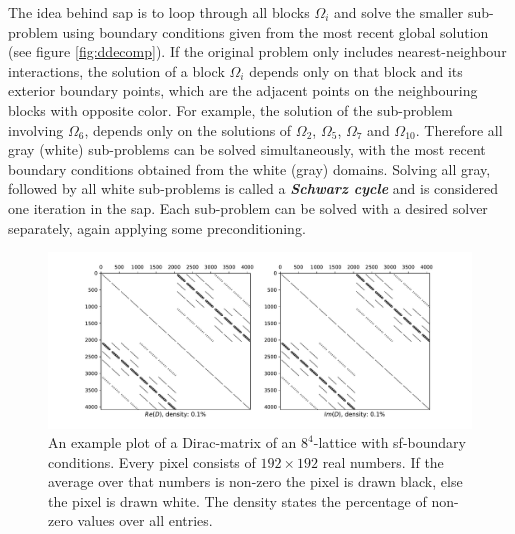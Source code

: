 \documentclass{article}
\theoremstyle{plain} %
\theoremstyle{convention} %
\theoremstyle{remark} %
\def\df#1{\textbf{\textit{#1}}}
\numberwithin{equation}{section}
\begin{document}
The idea behind \acrshort{sap} is to loop through all blocks $\Omega_i$ and solve the smaller sub-problem using boundary conditions given from the most recent global solution (see figure \ref{fig:ddecomp}). If the original problem only includes nearest-neighbour interactions, the solution of a block $\Omega_i$ depends only on that block and its exterior boundary points, which are the adjacent points on the neighbouring blocks with opposite color. For example, the solution of the sub-problem involving $\Omega_6$, depends only on the solutions of $\Omega_2$, $\Omega_5$, $\Omega_7$ and $\Omega_{10}$\footnotemark.
Therefore all gray (white) sub-problems can be solved simultaneously, with the most recent boundary conditions obtained from the white (gray) domains. Solving all gray, followed by all white sub-problems is called a \df{Schwarz cycle} and is considered one iteration in the \acrshort{sap}. Each sub-problem can be solved with a desired solver separately, again applying some preconditioning\footnotemark.

\begin{figure}[h]
    \centering
    \includegraphics[width=1.0\textwidth]{plots/dirac_matrix6}
    \caption{An example plot of a Dirac-matrix of an $8^4$-lattice with \acrshort{sf}-boundary conditions. Every pixel consists of $192 \times 192$ real numbers. If the average over that numbers is non-zero the pixel is drawn black, else the pixel is drawn white. The density states the percentage of non-zero values over all entries.}
    \label{fig:dirac_matrix}
\end{figure}
\end{document}
